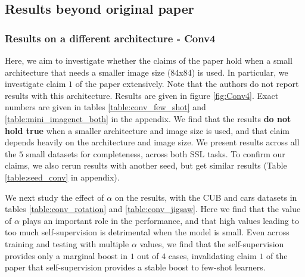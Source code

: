 
\subsection{Results beyond original paper}

\label{subsubsec:conv4}
\subsubsection{Results on a different architecture - Conv4}

Here, we aim to investigate whether the claims of the paper hold when a small architecture that needs a smaller image size (84x84) is used. In particular, we investigate claim $1$ of the paper extensively. Note that the authors do not report results with this architecture. Results are given in figure \ref{fig:Conv4}. Exact numbers are given in tables \ref{table:conv_few_shot} and \ref{table:mini_imagenet_both} in the appendix. We find that the results \textbf{do not hold true} when a smaller architecture and image size is used, and that claim depends heavily on the architecture and image size. We present results across all the $5$ small datasets for completeness, across both SSL tasks. To confirm our claims, we also rerun results with another seed, but get similar results (Table \ref{table:seed_conv} in appendix).  

We next study the effect of $\alpha$ on the results, with the CUB and cars datasets in tables \ref{table:conv_rotation} and \ref{table:conv_jigsaw}. Here we find that the value of $\alpha$ plays an important role in the performance, and that high values leading to too much self-supervision is detrimental when the model is small. Even across training and testing with multiple $\alpha$ values, we find that the self-supervision provides only a marginal boost in $1$ out of $4$ cases, invalidating claim $1$ of the paper that self-supervision provides a stable boost to few-shot learners.

    

